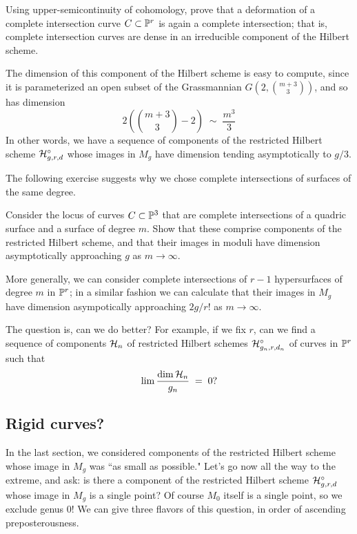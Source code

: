 \begin{exercise}
Using upper-semicontinuity of cohomology, prove that a deformation of a complete intersection curve $C \subset {\mathbb P}^r$ is again a complete intersection; that is, complete intersection curves are dense in an irreducible component of the Hilbert scheme.
\end{exercise} 

The dimension of this component of the Hilbert scheme is easy to compute, since it is parameterized  an open subset of the Grassmannian $G(2, \binom{m+3}{3})$, and so has dimension
$$
2(\binom{m+3}{3} - 2) \; \sim \; \frac{m^3}{3}
$$
In other words, we have a sequence of components of the restricted Hilbert scheme ${\cal H}^\circ_{g,r,d}$ whose images in $M_g$ have dimension tending asymptotically to $g/3$. 

The following exercise  suggests why we chose complete intersections of surfaces of the same degree.

\begin{exercise}
Consider the locus of curves $C \subset {\mathbb P}^3$ that are complete intersections of a quadric surface and a surface of degree $m$. Show that these comprise components of the restricted Hilbert scheme, and that their images in moduli have dimension asymptotically approaching $g$ as $m \to \infty$.
\end{exercise}

More generally, we can consider complete intersections of $r-1$ hypersurfaces of degree $m$ in ${\mathbb P}^r$; in a similar fashion we can calculate that their images in $M_g$ have dimension asympotically approaching $2g/r!$ as $m \to \infty$.

The question is, can we do better? For example, if we fix $r$, can we find a sequence of components ${\cal H}_n$ of  restricted Hilbert schemes  ${\cal H}^\circ_{g_n,r,d_n}$ of curves in ${\mathbb P}^r$ such that
$$
\lim \frac{\dim {\cal H}_n}{g_n} \; = \; 0?
$$

\subsection{Rigid curves?}

In the last section, we considered components of the restricted Hilbert scheme whose image in $M_g$ was ``as small as possible." Let's go now all the way to the extreme, and ask: is there a component of the restricted Hilbert scheme ${\cal H}^\circ_{g,r,d}$ whose image in $M_g$ is a single point? Of course $M_0$ itself is a single point, so we exclude genus 0! We can give three flavors of this question, in order of ascending preposterousness.

